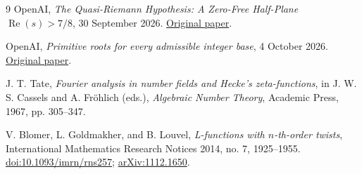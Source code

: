 \documentclass[11pt,a4paper]{article}
\theoremstyle{remark}\newtheorem{remark}[theorem]{Remark}
\numberwithin{equation}{section}
\begin{document}
\begin{thebibliography}{9}
 OpenAI,
\emph{The Quasi-Riemann Hypothesis: A Zero-Free Half-Plane
$\operatorname{Re}(s)>7/8$}, 30 September 2026.
\href{https://github.com/openai/math/blob/main/preprints/The-Quasi-Riemann-Hypothesis-September-30-2026/paper.pdf}{Original paper}.

 OpenAI,
\emph{Primitive roots for every admissible integer base},
4 October 2026.
\href{https://github.com/openai/math/blob/main/preprints/Primitive-roots-for-every-admissible-integer-base-October-4-2026/primitive-roots-all-integer-bases.pdf}{Original paper}.

 J. T. Tate,
\emph{Fourier analysis in number fields and Hecke's zeta-functions},
in J. W. S. Cassels and A. Fr\"ohlich (eds.),
\emph{Algebraic Number Theory}, Academic Press, 1967,
pp. 305--347.

 V. Blomer, L. Goldmakher, and B. Louvel,
\emph{L-functions with $n$-th-order twists},
International Mathematics Research Notices 2014, no. 7,
1925--1955.
\href{https://doi.org/10.1093/imrn/rns257}{doi:10.1093/imrn/rns257};
\href{https://arxiv.org/abs/1112.1650}{arXiv:1112.1650}.
\end{thebibliography}
\end{document}
